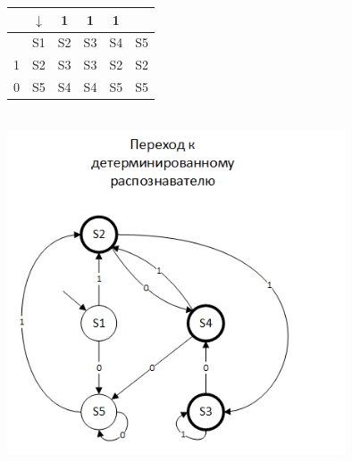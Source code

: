 \documentclass[a4paper,14pt]{extarticle}
\begin{document}
\begin{enumerate}[1.]
\begin{tabular}{|c|c|c|c|c|c|}
    \hline
& $\downarrow$ & 1&1&1&\\
\hline
  & S1 & S2 & S3 & S4 & S5\\
\hline
1 & S2 & S3 & S3 & S2 & S2\\
\hline
0 & S5 & S4 & S4 & S5 & S5\\
\hline
\end{tabular}\\
\includegraphics[width=100mm]{task3_new_determined}


\end{enumerate}
\end{document}

